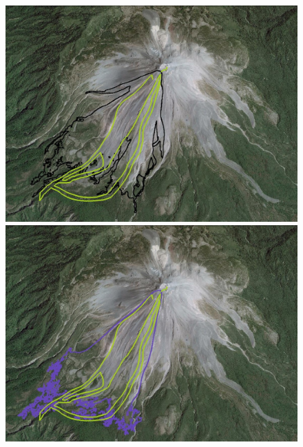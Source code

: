\documentclass[review]{elsarticle}
\begin{document}
\begin{figure}[H]
\begin{minipage}[b]{.5\textwidth}
        \centering
                \includegraphics[width=1\textwidth]{IMAGES/tiny1.jpg}
                \includegraphics[width=1\textwidth]{IMAGES/levelset1.jpg}
\end{minipage}
\begin{minipage}[b]{.5 \textwidth}
                \centering

\end{minipage}
\end{figure}
\end{document}
